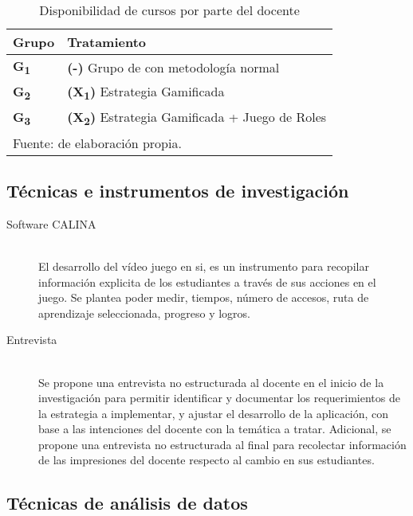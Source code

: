 \begin{table}[h]
\caption{Disponibilidad de cursos por parte del docente}
\label{tab:cuasi}
\begin{center}
\begin{tabular}{ p{30mm} p{100mm} }
\toprule
	\textbf{Grupo} & \textbf{Tratamiento} \\
\midrule
	\textbf{G\textsubscript{1}} & \textbf{(-)} Grupo de con metodología normal\\
	\textbf{G\textsubscript{2}} & \textbf{(X\textsubscript{1})} Estrategia Gamificada\\
	\textbf{G\textsubscript{3}} & \textbf{(X\textsubscript{2})} Estrategia Gamificada + Juego de Roles\\
\bottomrule
	\multicolumn{2}{l}{\footnotesize Fuente: de elaboración propia.}\\
\end{tabular}
\end{center}
\end{table}

\subsection{Técnicas e instrumentos de investigación}

\begin{description}
\item[Software CALINA] \hfill \\ El desarrollo del vídeo juego en si, es un instrumento para 
recopilar información explicita de los estudiantes a través de sus acciones en el juego. Se plantea poder 
medir, tiempos, número de accesos, ruta de aprendizaje seleccionada, progreso y logros.
\item[Entrevista] \hfill \\ Se propone una entrevista no estructurada al docente en el inicio de la 
investigación para permitir identificar y documentar los requerimientos de la estrategia a implementar, y 
ajustar el desarrollo de la aplicación, con base a las intenciones del docente con la temática a tratar. 
Adicional, se propone una entrevista no estructurada al final para recolectar información de las impresiones
del docente respecto al cambio en sus estudiantes.
\end{description}

\subsection{Técnicas de análisis de datos}

